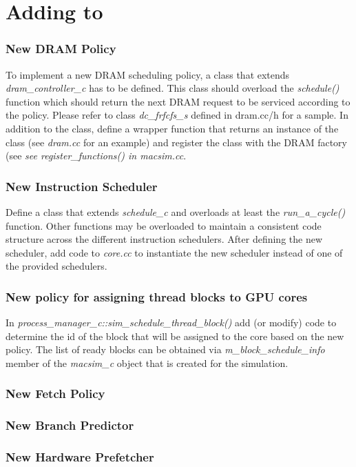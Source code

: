 \chapter{Adding to \SIM}
\label{sec:add_macsim}

\subsection{New DRAM Policy}

To implement a new DRAM scheduling policy, a class that extends
\textit{dram\_controller\_c} has to be defined. This class should overload the
\textit{schedule()} function which should return the next DRAM request to be
serviced according to the policy. Please refer to class \textit{dc\_frfcfs\_s}
defined in dram.cc/h for a sample. In addition to the class, define a wrapper
function that returns an instance of the class (see \textit{dram.cc} for an
    example) and register the class with the DRAM factory (see \textit{see
      register\_functions() in \textit{macsim.cc}}. 


\subsection{New Instruction Scheduler}

Define a class that extends \textit{schedule\_c} and overloads at least the
\textit{run\_a\_cycle()} function. Other functions may be overloaded to
maintain a consistent code structure across the different instruction
schedulers. After defining the new scheduler, add code to \textit{core.cc} to
instantiate the new scheduler instead of one of the provided schedulers.

\subsection{New policy for assigning thread blocks to GPU cores}

In \textit{process\_manager\_c::sim\_schedule\_thread\_block()} add (or modify)
code to determine the id of the block that will be assigned to the core based
on the new policy. The list of ready blocks can be obtained via
\textit{m\_block\_schedule\_info} member of the \textit{macsim\_c} object that
is created for the simulation.

\subsection{New Fetch Policy}

\subsection{New Branch Predictor}

\subsection{New Hardware Prefetcher}




